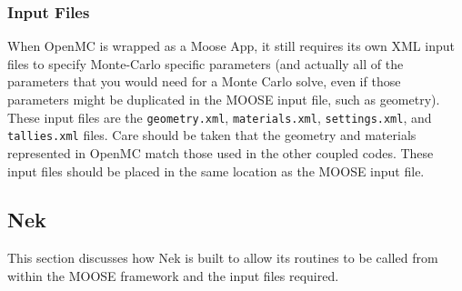 \documentclass[10pt]{article}
\numberwithin{equation}{section} %
\begin{document}
\subsubsection{Input Files}
When OpenMC is wrapped as a Moose App, it still requires its own XML input files to specify Monte-Carlo specific parameters (and actually all of the parameters that you would need for a Monte Carlo solve, even if those parameters might be duplicated in the MOOSE input file, such as geometry). These input files are the {\tt geometry.xml}, {\tt materials.xml}, {\tt settings.xml}, and {\tt tallies.xml} files. Care should be taken that the geometry and materials represented in OpenMC match those used in the other coupled codes. These input files should be placed in the same location as the MOOSE input file.

\subsection{Nek}
This section discusses how Nek is built to allow its routines to be called from within the MOOSE framework and the input files required.

\end{document}

